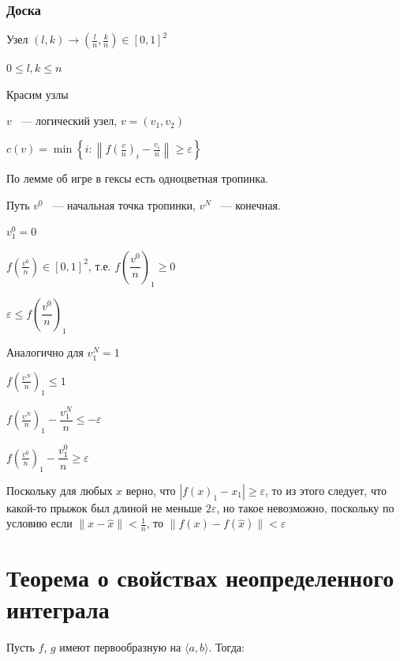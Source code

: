 \documentclass{article}
\begin{document}
        \subsubsection{Доска}
				
            Узел $(l, k) \rightarrow \left(\frac{l}{n}, \frac{k}{n}\right) \in [0, 1]^2$
				
			$0 \leq l, k \leq n$
				
			Красим узлы
				
			$v$ ~--- логический узел, $v = (v_1, v_2)$
				
			$c(v) = \min \left\{ i : \left\| f\left(\frac{v}{n}\right)_i - \frac{v_i}{n} \right\| \geq \varepsilon \right\}$
			
			По лемме об игре в гексы есть одноцветная тропинка.
				
			Путь $v^0$ ~--- начальная точка тропинки, $v^N$ ~--- конечная.
				
			$v^0_1 = 0$
				
			$f\left(\frac{v^0}{n}\right) \in [0, 1]^2$, т.е. $f\left(\dfrac{v^0}{n}\right)_1 \geq 0$
				
			$\varepsilon \leq f\left(\dfrac{v^0}{n}\right)_1$
				
			Аналогично для $v^N_1 = 1$
				
			$f\left(\frac{v^N}{n}\right)_1 \leq 1$
				
			$f\left(\frac{v^N}{n}\right)_1 - \dfrac{v^N_1}{n} \leq -\varepsilon$
				
			$f\left(\frac{v^0}{n}\right)_1 - \dfrac{v^0_1}{n} \geq \varepsilon$
	
			Поскольку для любых $x$ верно, что $|f(x)_1 - x_1| \geq \varepsilon$, то из этого следует, что какой-то прыжок был длиной не меньше $2 \varepsilon$, но такое невозможно, поскольку по условию если $\| x - \widehat{x} \| < \frac{1}{n}$, то $\| f(x) - f(\widehat{x}) \| < \varepsilon$
				
				
	\newpage

	\section{Теорема о свойствах неопределенного интеграла}
	
		Пусть $f$, $g$ имеют первообразную на $\langle a, b \rangle$. Тогда:
		
\end{document}
